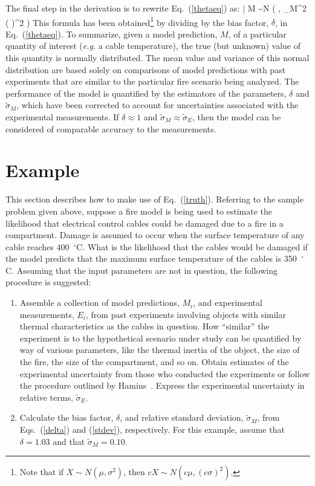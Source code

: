 The final step in the derivation is to rewrite Eq.~(\ref{thetaeq}) as:
\be
   \theta \; | \; M \sim N \left(  \; , \; \widetilde{\sigma}_M^2 \left(  \right)^2 \right) \label{truth}
\ee
This formula has been obtained\footnote{Note that if $X \sim N(\mu,\sigma^2)$, then
$cX \sim N ( c \mu , (c \sigma)^2)$.} by dividing by the bias factor, $\delta$, in Eq.~(\ref{thetaeq}). To summarize, given a model prediction, $M$,
of a particular quantity of interest ({\em e.g.} a cable temperature), the true (but unknown) value of this quantity is normally distributed. The mean value
and variance of this normal distribution are based solely on comparisons of model predictions with past experiments that are similar to the particular fire
scenario being analyzed. The performance of the model is quantified by the estimators of the parameters, $\delta$ and $\widetilde{\sigma}_M$, which
have been corrected to account for uncertainties associated with the experimental measurements.
If $\delta \approx 1$ and $\widetilde{\sigma}_M \approx \widetilde{\sigma}_E$, then the
model can be considered of comparable accuracy to the measurements.


\section{Example}

This section describes how to make use of Eq.~(\ref{truth}). Referring to the sample problem given above, suppose a fire model is being used to estimate the likelihood that
electrical control cables could be damaged due to a fire in a compartment.
Damage is assumed to occur when the surface temperature of any cable reaches 400~$^\circ$C.
What is the likelihood that the cables would be damaged if the
model predicts that the maximum surface temperature of the cables is 350~$^\circ$C. Assuming that the input parameters are not in question, the following
procedure is suggested:
\begin{enumerate}
\item Assemble a collection of model predictions, $M_i$, and experimental measurements, $E_i$, from
past experiments involving objects with similar thermal characteristics as the cables in question.
How ``similar'' the experiment is to the hypothetical scenario under study can be quantified by way of
various parameters, like the thermal inertia of the object, the size of the fire, the size of the compartment, and so on. Obtain estimates of the
experimental uncertainty from those who conducted the experiments or follow the procedure outlined by Hamins~\cite{NUREG_1824}. Express the
experimental uncertainty in relative terms, $\widetilde{\sigma}_E$.
\item Calculate the bias factor, $\delta$, and relative standard deviation, $\tilde{\sigma}_M$, from Eqs.~(\ref{delta}) and (\ref{stdev}), respectively.
For this example, assume that $\delta=1.03$ and that $\widetilde{\sigma}_M=0.10$.
\end{enumerate}

